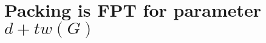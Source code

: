 \documentclass[10pt, a4paper]{article}
\theoremstyle{definition}
\begin{document}



\section{\sc Packing \textnormal{is FPT for parameter $d + tw(G)$}}
\end{document}
